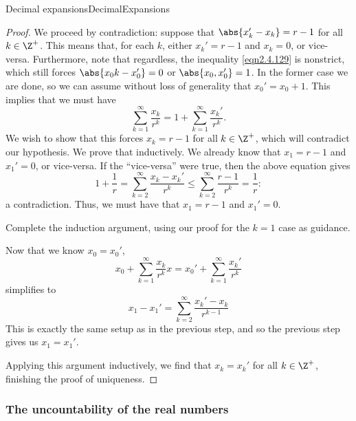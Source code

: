 \begin{thm}{Decimal expansions}{DecimalExpansions}
\begin{proof}
We proceed by contradiction:  suppose that $\abs{x_k'-x_k}=r-1$ for all $k\in \Z ^+$.  This means that, for each $k$, either $x_k'=r-1$ and $x_k=0$, or vice-versa. Furthermore, note that regardless, the inequality \eqref{eqn2.4.129} is nonstrict, which still forces $\abs{x_0k-x_0'}=0$ or $\abs{x_0,x_0'}=1$.  In the former case we are done, so we can assume without loss of generality that $x_0'=x_0+1$.  This implies that we must have
\begin{equation}
\sum _{k=1}^{\infty}\frac{x_k}{r^k}=1+\sum _{k=1}^{\infty}\frac{x_k'}{r^k}.
\end{equation}
We wish to show that this forces $x_k=r-1$ for all $k\in \Z ^+$, which will contradict our hypothesis.  We prove that inductively.  We already know that $x_1=r-1$ and $x_1'=0$, or vice-versa.  If the ``vice-versa'' were true, then the above equation gives
\begin{equation}
1+\frac{1}{r}=\sum _{k=2}^{\infty}\frac{x_k-x_k'}{r^k}\leq \sum _{k=2}^{\infty}\frac{r-1}{r^k}=\frac{1}{r}:
\end{equation}
a contradiction.  Thus, we must have that $x_1=r-1$ and $x_1'=0$.
\begin{exr}{}{}
Complete the induction argument, using our proof for the $k=1$ case as guidance.
\end{exr}

Now that we know $x_0=x_0'$,
\begin{equation}
x_0+\sum _{k=1}^{\infty}\frac{x_k}{r^k}x=x_0'+\sum _{k=1}^{\infty}\frac{x_k'}{r^k}
\end{equation}
simplifies to
\begin{equation}
x_1-x_1'=\sum _{k=2}^{\infty}\frac{x_k'-x_k}{r^{k-1}}
\end{equation}
This is exactly the same setup as in the previous step, and so the previous step gives us $x_1=x_1'$.

Applying this argument inductively, we find that $x_k=x_k'$ for all $k\in \Z ^+$, finishing the proof of uniqueness.
\end{proof}
\end{thm}

\subsubsection{The uncountability of the real numbers}\label{sss2.4.3}

